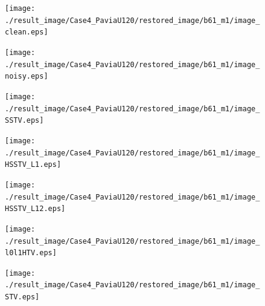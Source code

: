 \begin{figure}[t]
	\begin{center}
		\begin{minipage}{0.125\hsize}
			\centerline{\texttt{[image: ./result\_image/Case4\_PaviaU120/restored\_image/b61\_m1/image\_clean.eps]}} %
		\end{minipage}
		\begin{minipage}{0.125\hsize}
			\centerline{\texttt{[image: ./result\_image/Case4\_PaviaU120/restored\_image/b61\_m1/image\_noisy.eps]}} %
		\end{minipage}
		\begin{minipage}{0.125\hsize}
			\centerline{\texttt{[image: ./result\_image/Case4\_PaviaU120/restored\_image/b61\_m1/image\_SSTV.eps]}} %
		\end{minipage}
		\begin{minipage}{0.125\hsize}
			\centerline{\texttt{[image: ./result\_image/Case4\_PaviaU120/restored\_image/b61\_m1/image\_HSSTV\_L1.eps]}} %
		\end{minipage}
		\begin{minipage}{0.125\hsize}
			\centerline{\texttt{[image: ./result\_image/Case4\_PaviaU120/restored\_image/b61\_m1/image\_HSSTV\_L12.eps]}} %
		\end{minipage}
		\begin{minipage}{0.125\hsize}
			\centerline{\texttt{[image: ./result\_image/Case4\_PaviaU120/restored\_image/b61\_m1/image\_l0l1HTV.eps]}} %
		\end{minipage}
		\begin{minipage}{0.125\hsize}
			\centerline{\texttt{[image: ./result\_image/Case4\_PaviaU120/restored\_image/b61\_m1/image\_STV.eps]}} %
		\end{minipage}
		\begin{minipage}{0.050\hsize}
			\centerline{\hspace{\hsize}} %
		\end{minipage}
		
		\vspace{1mm}
		

\end{center}
\end{figure}
